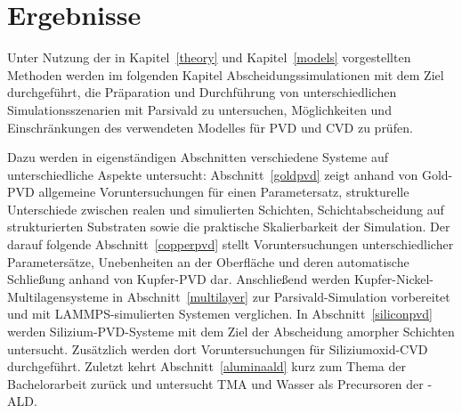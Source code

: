 \chapter{Ergebnisse}
\label{results}

Unter Nutzung der in Kapitel~\ref{theory} und Kapitel~\ref{models} vorgestellten Methoden werden im folgenden Kapitel Abscheidungssimulationen mit dem Ziel durchgeführt, die Präparation und Durchführung von unterschiedlichen Simulationsszenarien mit Parsivald zu untersuchen, Möglichkeiten und Einschränkungen des verwendeten Modelles für PVD und CVD zu prüfen.

Dazu werden in eigenständigen Abschnitten verschiedene Systeme auf unterschiedliche Aspekte untersucht:
Abschnitt~\ref{goldpvd} zeigt anhand von Gold-PVD allgemeine Voruntersuchungen für einen Parametersatz, strukturelle Unterschiede zwischen realen und simulierten Schichten, Schichtabscheidung auf strukturierten Substraten sowie die praktische Skalierbarkeit der Simulation.
Der darauf folgende Abschnitt~\ref{copperpvd} stellt Voruntersuchungen unterschiedlicher Parametersätze, Unebenheiten an der Oberfläche und deren automatische Schließung anhand von Kupfer-PVD dar.
Anschließend werden Kupfer-Nickel-Multilagensysteme in Abschnitt~\ref{multilayer} zur Parsivald-Simulation vorbereitet und mit LAMMPS-simulierten Systemen verglichen.
In Abschnitt~\ref{siliconpvd} werden Silizium-PVD-Systeme mit dem Ziel der Abscheidung amorpher Schichten untersucht.
Zusätzlich werden dort Voruntersuchungen für Siliziumoxid-CVD durchgeführt.
Zuletzt kehrt Abschnitt~\ref{aluminaald} kurz zum Thema der Bachelorarbeit zurück und untersucht TMA und Wasser als Precursoren der -ALD.


\clearpage

\clearpage

\clearpage

\clearpage


